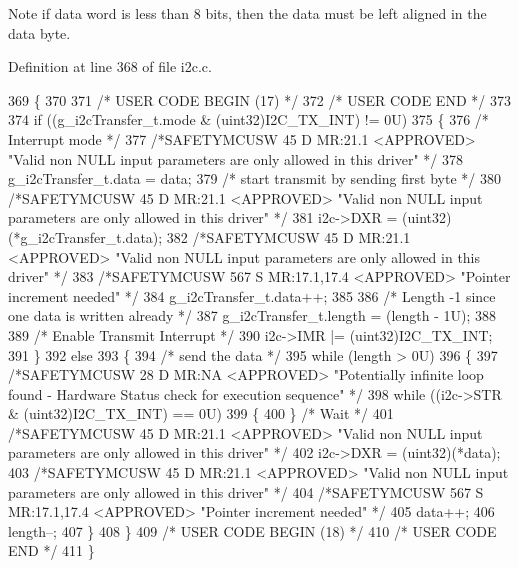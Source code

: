 \begin{DoxyNote}{Note}
if data word is less than 8 bits, then the data must be left aligned in the data byte. 
\end{DoxyNote}


Definition at line 368 of file i2c.\+c.


\begin{DoxyCode}
369 \{
370 
371 \textcolor{comment}{/* USER CODE BEGIN (17) */}
372 \textcolor{comment}{/* USER CODE END */}
373 
374     \textcolor{keywordflow}{if} ((g\_i2cTransfer\_t.mode & (uint32)I2C\_TX\_INT) != 0U)
375     \{
376         \textcolor{comment}{/* Interrupt mode */}
377         \textcolor{comment}{/*SAFETYMCUSW 45 D MR:21.1 <APPROVED> "Valid non NULL input parameters are only allowed in this
       driver" */}
378         g\_i2cTransfer\_t.data   = data;
379         \textcolor{comment}{/* start transmit by sending first byte */}
380         \textcolor{comment}{/*SAFETYMCUSW 45 D MR:21.1 <APPROVED> "Valid non NULL input parameters are only allowed in this
       driver" */}
381         i2c->DXR = (uint32)(*g\_i2cTransfer\_t.data);
382         \textcolor{comment}{/*SAFETYMCUSW 45 D MR:21.1 <APPROVED> "Valid non NULL input parameters are only allowed in this
       driver" */}
383         \textcolor{comment}{/*SAFETYMCUSW 567 S MR:17.1,17.4 <APPROVED> "Pointer increment needed" */}
384         g\_i2cTransfer\_t.data++;
385 
386         \textcolor{comment}{/* Length -1 since one data is written already */}
387         g\_i2cTransfer\_t.length = (length - 1U);
388 
389         \textcolor{comment}{/* Enable Transmit Interrupt */}
390         i2c->IMR |= (uint32)I2C\_TX\_INT;
391     \}
392     \textcolor{keywordflow}{else}
393     \{
394         \textcolor{comment}{/* send the data */}
395         \textcolor{keywordflow}{while} (length > 0U)
396         \{
397             \textcolor{comment}{/*SAFETYMCUSW 28 D MR:NA <APPROVED> "Potentially infinite loop found - Hardware Status check
       for execution sequence" */}
398             \textcolor{keywordflow}{while} ((i2c->STR & (uint32)I2C\_TX\_INT) == 0U)
399             \{
400             \} \textcolor{comment}{/* Wait */}
401             \textcolor{comment}{/*SAFETYMCUSW 45 D MR:21.1 <APPROVED> "Valid non NULL input parameters are only allowed in this
       driver" */}
402             i2c->DXR = (uint32)(*data);
403             \textcolor{comment}{/*SAFETYMCUSW 45 D MR:21.1 <APPROVED> "Valid non NULL input parameters are only allowed in this
       driver" */}
404             \textcolor{comment}{/*SAFETYMCUSW 567 S MR:17.1,17.4 <APPROVED> "Pointer increment needed" */}
405             data++;
406             length--;
407         \}
408     \}
409 \textcolor{comment}{/* USER CODE BEGIN (18) */}
410 \textcolor{comment}{/* USER CODE END */}
411 \}
\end{DoxyCode}
\mbox{\label{group__I2C_gab75d636550cd8d371e1204ee5040824a}} 
